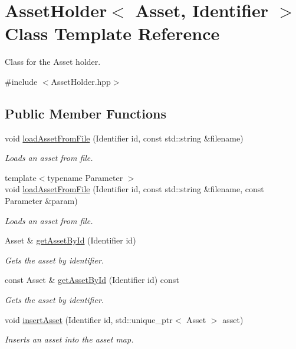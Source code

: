 \hypertarget{classAssetHolder}{}\section{Asset\+Holder$<$ Asset, Identifier $>$ Class Template Reference}
\label{classAssetHolder}


Class for the Asset holder.  




{\ttfamily \#include $<$Asset\+Holder.\+hpp$>$}

\subsection*{Public Member Functions}
\begin{DoxyCompactItemize}
\item 
void \mbox{\hyperlink{classAssetHolder_a3070fe83d5ef54d75011d2162b2d9948}{load\+Asset\+From\+File}} (Identifier id, const std\+::string \&filename)
\begin{DoxyCompactList}\small\item\em Loads an asset from file. \end{DoxyCompactList}\item 
{\footnotesize template$<$typename Parameter $>$ }\\void \mbox{\hyperlink{classAssetHolder_a4af355fb6909c492ad8a879130bd8897}{load\+Asset\+From\+File}} (Identifier id, const std\+::string \&filename, const Parameter \&param)
\begin{DoxyCompactList}\small\item\em Loads an asset from file. \end{DoxyCompactList}\item 
Asset \& \mbox{\hyperlink{classAssetHolder_a73d1b14e75170e91a25d4f78a9494b0e}{get\+Asset\+By\+Id}} (Identifier id)
\begin{DoxyCompactList}\small\item\em Gets the asset by identifier. \end{DoxyCompactList}\item 
const Asset \& \mbox{\hyperlink{classAssetHolder_a6e31c8853bf2442e58224f445b2be4bf}{get\+Asset\+By\+Id}} (Identifier id) const
\begin{DoxyCompactList}\small\item\em Gets the asset by identifier. \end{DoxyCompactList}\item 
void \mbox{\hyperlink{classAssetHolder_ae7d64002db05c07fa914d5fa902a98ee}{insert\+Asset}} (Identifier id, std\+::unique\+\_\+ptr$<$ Asset $>$ asset)
\begin{DoxyCompactList}\small\item\em Inserts an asset into the asset map. \end{DoxyCompactList}\end{DoxyCompactItemize}


